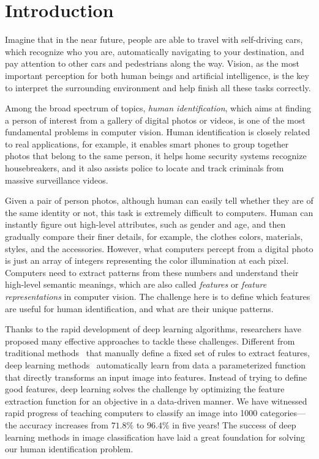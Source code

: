 \chapter{Introduction}
\label{ch:introduction}

Imagine that in the near future, people are able to travel with self-driving cars, which recognize who you are, automatically navigating to your destination, and pay attention to other cars and pedestrians along the way. Vision, as the most important perception for both human beings and artificial intelligence, is the key to interpret the surrounding environment and help finish all these tasks correctly.

Among the broad spectrum of topics, \emph{human identification}, which aims at finding a person of interest from a gallery of digital photos or videos, is one of the most fundamental problems in computer vision. Human identification is closely related to real applications, for example, it enables smart phones to group together photos that belong to the same person, it helps home security systems recognize housebreakers, and it also assists police to locate and track criminals from massive surveillance videos.

Given a pair of person photos, although human can easily tell whether they are of the same identity or not, this task is extremely difficult to computers. Human can instantly figure out high-level attributes, such as gender and age, and then gradually compare their finer details, for example, the clothes colors, materials, styles, and the accessories. However, what computers percept from a digital photo is just an array of integers representing the color illumination at each pixel. Computers need to extract patterns from these numbers and understand their high-level semantic meanings, which are also called \emph{features} or \emph{feature representations} in computer vision. The challenge here is to define which features are useful for human identification, and what are their unique patterns.

Thanks to the rapid development of deep learning algorithms, researchers have proposed many effective approaches to tackle these challenges. Different from traditional methods~\cite{lowe2004distinctive,dalal2005histograms,bay2008speeded,farenzena2010person,liao2015person} that manually define a fixed set of rules to extract features, deep learning methods~\cite{krizhevsky2012imagenet,simonyan2014very,szegedy2014going,he2015deep} automatically learn from data a parameterized function that directly transforms an input image into features. Instead of trying to define good features, deep learning solves the challenge by optimizing the feature extraction function for an objective in a data-driven manner. We have witnessed rapid progress of teaching computers to classify an image into 1000 categories---the accuracy increases from $71.8\%$ to $96.4\%$ in five years! The success of deep learning methods in image classification have laid a great foundation for solving our human identification problem.

